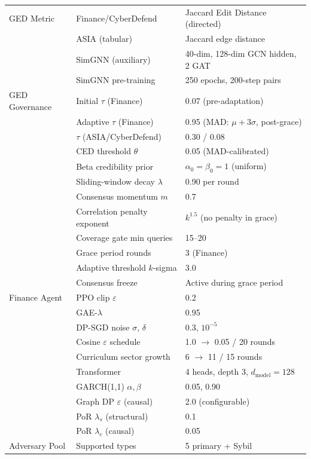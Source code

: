 \documentclass[journal]{IEEEtran}
\begin{document}
\begin{table}[!tp]
\begin{tabular}{lll}
\hline
GED Metric & Finance/CyberDefend & Jaccard Edit Distance (directed) \\
 & ASIA (tabular) & Jaccard edge distance \\
 & SimGNN (auxiliary) & 40-dim, 128-dim GCN hidden, 2 GAT \\
 & SimGNN pre-training & 250 epochs, 200-step pairs \\
\hline
GED Governance & Initial $\tau$ (Finance) & 0.07 (pre-adaptation) \\
 & Adaptive $\tau$ (Finance) & 0.95 (MAD: $\mu+3\sigma$, post-grace) \\
 & $\tau$ (ASIA/CyberDefend) & 0.30 / 0.08 \\
 & CED threshold $\theta$ & 0.05 (MAD-calibrated) \\
 & Beta credibility prior & $\alpha_0{=}\beta_0{=}1$ (uniform) \\
 & Sliding-window decay $\lambda$ & 0.90 per round \\
 & Consensus momentum $m$ & 0.7 \\
 & Correlation penalty exponent & $k^{1.5}$ (no penalty in grace) \\
 & Coverage gate min queries & 15--20 \\
 & Grace period rounds & 3 (Finance) \\
 & Adaptive threshold $k$-sigma & 3.0 \\
 & Consensus freeze & Active during grace period \\
\hline
Finance Agent & PPO clip $\varepsilon$ & 0.2 \\
 & GAE-$\lambda$ & 0.95 \\
 & DP-SGD noise $\sigma$, $\delta$ & 0.3, $10^{-5}$ \\
 & Cosine $\varepsilon$ schedule & 1.0 $\to$ 0.05 / 20 rounds \\
 & Curriculum sector growth & 6 $\to$ 11 / 15 rounds \\
 & Transformer & 4 heads, depth 3, $d_{\text{model}}{=}128$ \\
 & GARCH(1,1) $\alpha, \beta$ & 0.05, 0.90 \\
 & Graph DP $\varepsilon$ (causal) & 2.0 (configurable) \\
 & PoR $\lambda_s$ (structural) & 0.1 \\
 & PoR $\lambda_c$ (causal) & 0.05 \\
\hline
Adversary Pool & Supported types & 5 primary + Sybil \\

\end{tabular}
\end{table}
\end{document}
